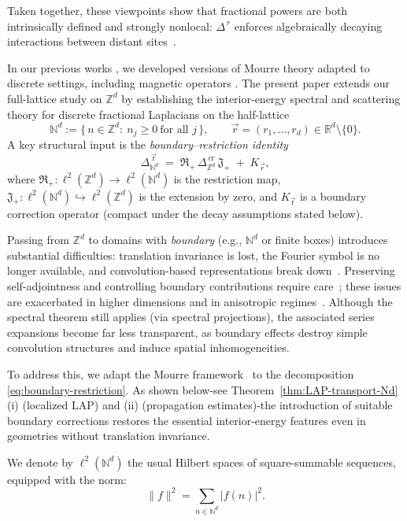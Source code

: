 \documentclass[10pt]{amsart}
\newcommand{\R}{{\mathbb{R}}}
\newcommand{\Z}{{\mathbb{Z}}}
\newcommand{\N}{{\mathbb{N}}}
\newcommand{\1}{{\mathbb{I}}}
\numberwithin{equation}{section}
\begin{document}
\noindent
Taken together, these viewpoints show that fractional powers are both intrinsically defined and strongly nonlocal: $\Delta^{\,r}$ enforces algebraically decaying interactions between distant sites~\cite{ScSo2012,K2017}.


In our previous works \cite{AEG, AEG1, AEGJ, AEGJ2}, we developed versions of Mourre theory
adapted to discrete settings, including magnetic operators \cite{AEG1, ABDE}.
The present paper extends our full-lattice study on $\Z^d$ by establishing the
interior-energy spectral and scattering theory for discrete fractional Laplacians
on the half-lattice
\[
\N^d := \{\,n\in\Z^d:\ n_j\ge 0\ \text{for all }j\,\},
\qquad
\vec r=(r_1,\dots,r_d)\in\R^d\setminus\{0\}.
\]
A key structural input is the \emph{boundary--restriction identity}
\begin{equation}\label{eq:boundary-restriction}
\Delta_{\N^d}^{\, \vec{\mathrm{ r}}}
\;=\;
\mathfrak R_+\,\Delta_{\Z^d}^{\,c{\mathrm{ r}}}\,\mathfrak J_+
\;+\; K_{\vec r},
\end{equation}
where $\mathfrak R_+:\ell^2(\Z^d)\to\ell^2(\N^d)$ is the restriction map,
$\mathfrak J_+:\ell^2(\N^d)\hookrightarrow\ell^2(\Z^d)$ is the extension by zero,
and $K_{\vec{\mathrm{r}}}$ is a boundary correction operator (compact under the decay assumptions stated below).


Passing from $\mathbb{Z}^d$ to domains with \emph{boundary} (e.g., $\mathbb{N}^d$ or finite boxes) introduces substantial difficulties: translation invariance is lost, the Fourier symbol is no longer available, and convolution-based representations break down~\cite{HK}. Preserving self-adjointness and controlling boundary contributions require care~\cite{K2017,ScSo2012}; these issues are exacerbated in higher dimensions and in anisotropic regimes~\cite{Fan2021,L2000}. Although the spectral theorem still applies (via spectral projections), the associated series expansions become far less transparent, as boundary effects destroy simple convolution structures and induce spatial inhomogeneities.

To address this, we adapt the Mourre framework~\cite{Mo81,Mo83,ABG,Ge2015,GGM1} to the decomposition \eqref{eq:boundary-restriction}. As shown below-see Theorem~\ref{thm:LAP-transport-Nd} (i) (localized LAP) and (ii) (propagation estimates)-the introduction of suitable boundary corrections restores the essential interior-energy features even in geometries without translation invariance.

\smallskip
\noindent We denote by  $\ell^2(\mathbb{N}^d)$ the usual Hilbert spaces of square-summable sequences, equipped with the norm:
\[
\|f\|^2 = \sum_{n\in \N^{d}} |f(n)|^2.
\]
\end{document}
